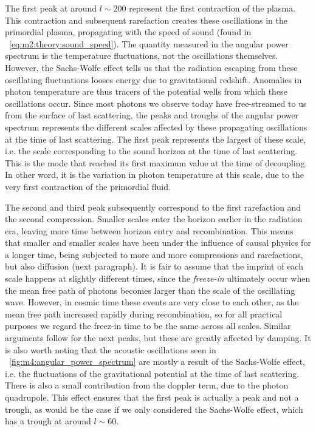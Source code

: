         The first peak at around $l\sim200$ represent the first contraction of the plasma. This contraction and subsequent rarefaction creates these oscillations in the primordial plasma, propagating with the speed of sound (found in ~\cref{eq:m2:theory:sound_speed}). The quantity measured in the angular power spectrum is the temperature fluctuations, not the oscillations themselves. However, the Sachs-Wolfe effect tells us that the radiation escaping from these oscillating fluctuations looses energy due to gravitational redshift. Anomalies in photon temperature are thus tracers of the potential wells from which these oscillations occur. Since most photons we observe today have free-streamed to us from the surface of last scattering, the peaks and troughs of the angular power spectrum represents the different scales affected by these propagating oscillations at the time of last scattering. The first peak represents the largest of these scale, i.e. the scale corresponding to the sound horizon at the time of last scattering. This is the mode that reached its first maximum value at the time of decoupling. In other word, it is the variation in photon temperature at this scale, due to the very first contraction of the primordial fluid. 

        The second and third peak subsequently correspond to the first rarefaction and the second compression. Smaller scales enter the horizon earlier in the radiation era, leaving more time between horizon entry and recombination. This means that smaller and smaller scales have been under the influence of causal physics for a longer time, being subjected to more and more compressions and rarefactions, but also diffusion (next paragraph). It is fair to assume that the imprint of each scale happens at slightly different times, since the \textit{freeze-in} ultimately occur when the mean free path of photons becomes larger than the scale of the oscillating wave. However, in cosmic time these events are very close to each other, as the mean free path increased rapidly during recombination, so for all practical purposes we regard the freez-in time to be the same across all scales. Similar arguments follow for the next peaks, but these are greatly affected by damping. It is also worth noting that the acoustic oscillations seen in ~\cref{fig:m4:angular_power_spectrum} are mostly a result of the Sachs-Wolfe effect, i.e. the fluctuations of the gravitational potential at the time of last scattering. There is also a small contribution from the doppler term, due to the photon quadrupole. This effect ensures that the first peak is actually a peak and not a trough, as would be the case if we only considered the Sachs-Wolfe effect, which has a trough at around $l\sim 60$. 

